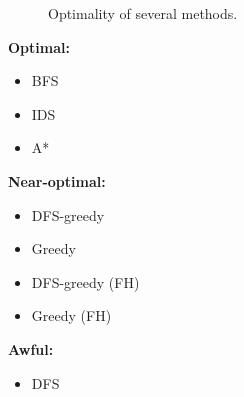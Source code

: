\documentclass{beamer}
\begin{document}
\begin{frame}
\begin{minipage}[c]{0.73\textwidth}
\begin{figure}
      \caption{Optimality of several methods.}
    \end{figure}
  \end{minipage}
  \begin{minipage}[c]{0.26\textwidth}
    \textbf{Optimal:}
    \begin{itemize}
      \item BFS
      \item IDS
      \item A*
    \end{itemize}
    \textbf{Near-optimal:}
    \begin{itemize}
      \item DFS-greedy
      \item Greedy
      \item DFS-greedy (FH)
      \item Greedy (FH)
    \end{itemize}
    \textbf{Awful:}
    \begin{itemize}
      \item DFS
    \end{itemize}
  \end{minipage}

\end{frame}
\end{document}
